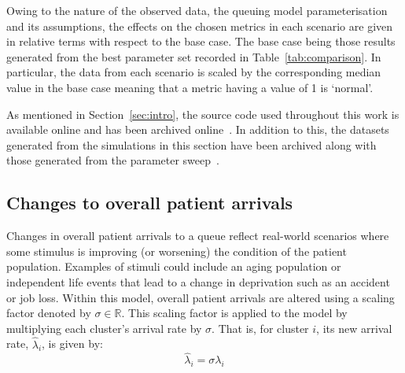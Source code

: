 \documentclass[11pt]{article}
\begin{document}
Owing to the nature of the observed data, the queuing model parameterisation
and its assumptions, the effects on the chosen metrics in each scenario are
given in relative terms with respect to the base case. The base case being those
results generated from the best parameter set recorded in
Table~\ref{tab:comparison}. In particular, the data from each scenario is scaled
by the corresponding median value in the base case meaning that a metric having
a value of 1 is `normal'.

As mentioned in Section~\ref{sec:intro}, the source code used throughout this
work is available online and has been archived online~\cite{Wilde2020github}. In
addition to this, the datasets generated from the simulations in this section
have been archived along with those generated from the parameter
sweep~\cite{Wilde2020results}.


\subsection{Changes to overall patient arrivals}\label{subsec:arrivals}

Changes in overall patient arrivals to a queue reflect real-world scenarios
where some stimulus is improving (or worsening) the condition of the patient
population. Examples of stimuli could include an aging population or independent
life events that lead to a change in deprivation such as an accident or job
loss. Within this model, overall patient arrivals are altered using a scaling
factor denoted by \(\sigma\in\mathbb{R}\). This scaling factor is applied to the
model by multiplying each cluster's arrival rate by \(\sigma\). That is, for
cluster \(i\), its new arrival rate, \(\hat\lambda_i\), is given by:
\begin{equation}\label{eq:lambda}
    \hat\lambda_{i} = \sigma\lambda_i
\end{equation}
\end{document}
